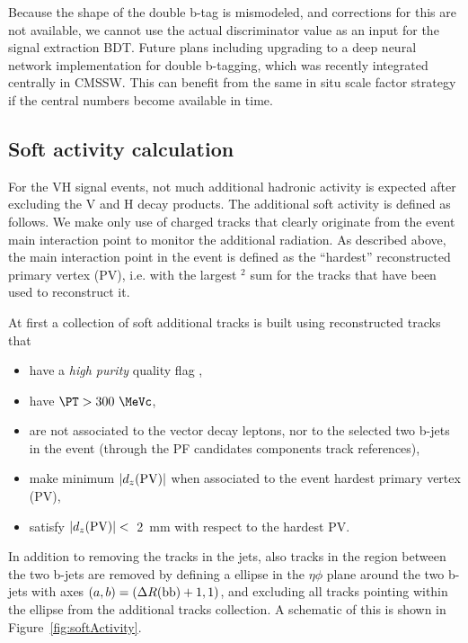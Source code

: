 Because the shape of the double b-tag is mismodeled, and corrections for this are not available,
we cannot use the actual discriminator value as an input for the signal extraction BDT.
Future plans including upgrading to a deep neural network implementation for double b-tagging, which was recently integrated centrally in CMSSW.
This can benefit from the same in situ scale factor strategy if the central numbers become available in time.

\subsection{Soft activity calculation}\label{sec:soft}
For the VH signal events, not much additional hadronic activity is expected
after excluding the V and H decay products.
The additional soft activity is defined as follows.
We make only use of charged tracks that clearly originate from the event main interaction point
to monitor the additional radiation.
As described above, the main interaction point in the event is defined as the ``hardest''
reconstructed primary vertex (PV),
i.e. with the largest \pt$^2$ sum for the tracks that have been used to reconstruct it.

At first a collection of soft additional tracks is built using reconstructed tracks that 
\begin{itemize}
\item  have a  {\em high purity} quality flag ,
\item have $\PT>300~\MeVc$,
\item are not associated to the vector decay leptons, nor to the selected two b-jets in the event 
(through the PF candidates components track references),
\item make minimum $|d_z({\rm PV})|$ when associated to the event hardest primary vertex (PV), 
\item satisfy $|d_z({\rm PV})|<$~2~mm with respect to the hardest PV.
\end{itemize}

In addition to removing the tracks in the jets, also tracks in 
the region between the two b-jets are removed by defining a ellipse in 
the $\eta\phi$ plane around the two b-jets with axes $(a,b)= (\Delta R({\rm bb})+1,1)$,
and excluding all tracks pointing within the ellipse from the additional tracks collection.
A schematic of this is shown in Figure~\ref{fig:softActivity}.


